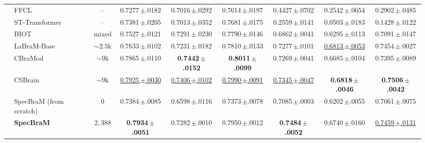 \documentclass[letterpaper]{article} %
\newcommand{\snd}[1]{\underline{#1}}   %
\newcommand{\best}[1]{\textbf{#1}}
\newcommand{\val}[2]{#1\,{\scriptsize$\pm$#2}}
\begin{document}
\begin{table}[t]
{\begin{tabular}{c l c ccc ccc}
& FFCL~\cite{li2022ffcl}            & -- & \val{0.7277}{.0182} & \val{0.7016}{.0292} & \val{0.7614}{.0197} & \val{0.4427}{.0702} & \val{0.2542}{.0654} & \val{0.2902}{.0485}\\
& ST-Transformer~\cite{song2021sttransformer}  & -- & \val{0.7381}{.0205} & \val{0.7013}{.0352} & \val{0.7681}{.0175} & \val{0.2559}{.0141} & \val{0.0503}{.0183} & \val{0.1428}{.0122}\\
\midrule
{}
& BIOT~\cite{yang2023biot}          & mixed        & \val{0.7527}{.0121} & \val{0.7291}{.0230} & \val{0.7790}{.0146} & \val{0.6862}{.0041} & \val{0.6295}{.0113} & \val{0.7091}{.0147}\\
& LaBraM-Base~\cite{jiang2024labram} & ${\sim}2.5$k & \val{0.7633}{.0102} & \val{0.7231}{.0182} & \val{0.7810}{.0133} & \val{0.7277}{.0101} & \snd{\val{0.6813}{.0053}} & \val{0.7454}{.0027}\\
& CBraMod~\cite{wang2025cbramod}     & ${\sim}9$k   & \val{0.7865}{.0110} & \best{\val{0.7442}{.0152}} & \best{\val{0.8011}{.0099}} & \val{0.7269}{.0041} & \val{0.6685}{.0104} & \val{0.7395}{.0089}\\
& CSBrain~\cite{csbrain}             & ${\sim}9$k   & \snd{\val{0.7925}{.0030}} & \snd{\val{0.7406}{.0102}} & \snd{\val{0.7990}{.0091}} & \snd{\val{0.7345}{.0047}} & \best{\val{0.6818}{.0046}} & \best{\val{0.7506}{.0042}}\\
\cmidrule(l){2-9}
& SpecBraM (from scratch)                & $0$          & \val{0.7384}{.0085} & \val{0.6598}{.0116} & \val{0.7373}{.0078} & \val{0.7085}{.0003} & \val{0.6202}{.0055} & \val{0.7061}{.0075}\\
& \textbf{SpecBraM}                      & $2{,}388$ & \best{\val{0.7934}{.0051}} & \val{0.7282}{.0010} & \val{0.7950}{.0012} & \best{\val{0.7484}{.0052}} & \val{0.6740}{.0160} & \snd{\val{0.7459}{.0131}}\\
\bottomrule
\end{tabular}}
\end{table}
\end{document}
